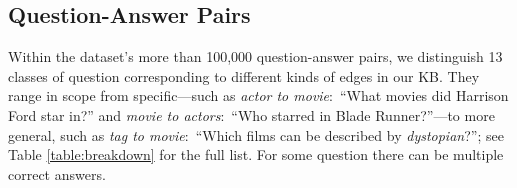 \subsection{Question-Answer Pairs}
%
Within the dataset's more than 100,000 question-answer pairs, we distinguish 13
classes of question corresponding to different kinds of edges in our KB.
They range in scope from specific---such as
{\em actor to movie}:~``What movies did Harrison Ford star in?'' and
{\em movie to actors}:~``Who starred in Blade Runner?''---to more general,
such as {\em tag to movie}:~``Which films can be described by {\em dystopian}?'';
see Table \ref{table:breakdown} for the full list.
For some question there can be multiple correct answers.
%
%

